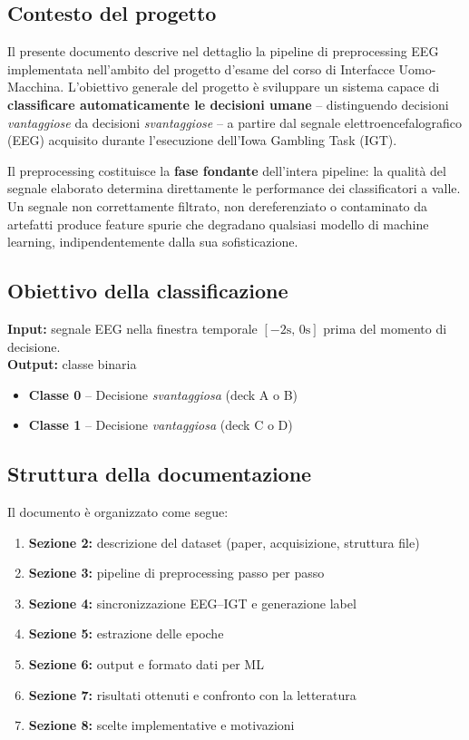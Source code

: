 \documentclass[12pt, a4paper]{article}
\begin{document}
\subsection{Contesto del progetto}

Il presente documento descrive nel dettaglio la pipeline di preprocessing EEG implementata nell'ambito del progetto d'esame del corso di Interfacce Uomo-Macchina. L'obiettivo generale del progetto è sviluppare un sistema capace di \textbf{classificare automaticamente le decisioni umane} -- distinguendo decisioni \textit{vantaggiose} da decisioni \textit{svantaggiose} -- a partire dal segnale elettroencefalografico (EEG) acquisito durante l'esecuzione dell'Iowa Gambling Task (IGT).

Il preprocessing costituisce la \textbf{fase fondante} dell'intera pipeline: la qualità del segnale elaborato determina direttamente le performance dei classificatori a valle. Un segnale non correttamente filtrato, non dereferenziato o contaminato da artefatti produce feature spurie che degradano qualsiasi modello di machine learning, indipendentemente dalla sua sofisticazione.

\subsection{Obiettivo della classificazione}

\begin{notabox}
\textbf{Input:} segnale EEG nella finestra temporale $[-2\text{s},\, 0\text{s}]$ prima del momento di decisione.\\[4pt]
\textbf{Output:} classe binaria
\begin{itemize}[noitemsep]
    \item \textbf{Classe 0} -- Decisione \textit{svantaggiosa} (deck A o B)
    \item \textbf{Classe 1} -- Decisione \textit{vantaggiosa} (deck C o D)
\end{itemize}
\end{notabox}

\subsection{Struttura della documentazione}

Il documento è organizzato come segue:
\begin{enumerate}
    \item \textbf{Sezione 2:} descrizione del dataset (paper, acquisizione, struttura file)
    \item \textbf{Sezione 3:} pipeline di preprocessing passo per passo
    \item \textbf{Sezione 4:} sincronizzazione EEG--IGT e generazione label
    \item \textbf{Sezione 5:} estrazione delle epoche
    \item \textbf{Sezione 6:} output e formato dati per ML
    \item \textbf{Sezione 7:} risultati ottenuti e confronto con la letteratura
    \item \textbf{Sezione 8:} scelte implementative e motivazioni
\end{enumerate}
\end{document}
